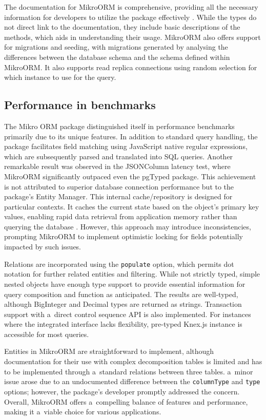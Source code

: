 The documentation for MikroORM is comprehensive, providing all the necessary
information for developers to utilize the package effectively
\cite{mikroORMDocs}. While the types do not direct link to the documentation,
they include basic descriptions of the methods, which aids in understanding
their usage. MikroORM also offers support for migrations and seeding, with
migrations generated by analysing the differences between the database schema
and the schema defined within MikroORM. It also supports read replica
connections using random selection for which instance to use for the query.

\subsection*{Performance in benchmarks}

The Mikro ORM package distinguished itself in performance benchmarks primarily
due to its unique features. In addition to standard query handling, the package
facilitates field matching using JavaScript native regular expressions, which
are subsequently parsed and translated into SQL queries. Another remarkable
result was observed in the JSONColumn latency test, where MikroORM significantly
outpaced even the pgTyped package. This achievement is not attributed to
superior database connection performance but to the package's Entity Manager.
This internal cache/repository is designed for particular contexts. It caches
the current state based on the object's primary key values, enabling rapid data
retrieval from application memory rather than querying the database
\cite{mikroORM-EM}. However, this approach may introduce inconsistencies,
prompting MikroORM to implement optimistic locking for fields potentially
impacted by such issues.

Relations are incorporated using the \texttt{populate} option, which permits dot
notation for further related entities and filtering. While not strictly typed,
simple nested objects have enough type support to provide essential information
for query composition and function as anticipated. The results are well-typed,
although BigInteger and Decimal types are returned as strings. Transaction
support with a~direct control sequence API is also implemented. For instances
where the integrated interface lacks flexibility, pre-typed Knex.js instance is
accessible for most queries.

Entities in MikroORM are straightforward to implement, although documentation
for their use with complex decomposition tables is limited and has to be
implemented through a~standard relations between three tables. a~minor issue
arose due to an undocumented difference between the \texttt{columnType} and
\texttt{type} options; however, the package's developer promptly addressed the
concern. Overall, MikroORM offers a~compelling balance of features and
performance, making it a~viable choice for various applications.
